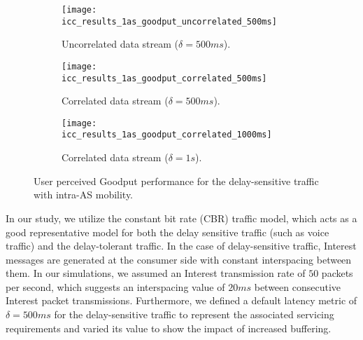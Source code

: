 \documentclass[conference]{IEEEtran}
\begin{document}
\begin{figure*}
        \centering
        \hspace{-0.15in}
        \begin{subfigure}[b]{0.3\textwidth}\centering
               \texttt{[image: icc\_results\_1as\_goodput\_uncorrelated\_500ms]}\\
               \caption{Uncorrelated data stream ($\delta = 500ms$).}
               \label{UncorrelatedGoodput}
        \end{subfigure}
        \hspace{0.05in}
        \begin{subfigure}[b]{0.3\textwidth}\centering
                \texttt{[image: icc\_results\_1as\_goodput\_correlated\_500ms]}\\
                \caption{Correlated data stream ($\delta = 500ms$).}
                \label{CorrelatedGoodput250ms}
        \end{subfigure}
        \hspace{0.05in}
        \begin{subfigure}[b]{0.3\textwidth}\centering
                \texttt{[image: icc\_results\_1as\_goodput\_correlated\_1000ms]}\\
                \caption{Correlated data stream ($\delta = 1s$).}
                \label{CorrelatedGoodput1000ms}
        \end{subfigure}
        \caption{User perceived Goodput performance for the delay-sensitive traffic with intra-AS mobility.}\label{fig:delay_sensitive_goodput}
\end{figure*}

In our study, we utilize the constant bit rate (CBR) traffic model, which acts as a good representative model for both the delay sensitive traffic (such as voice traffic) and the delay-tolerant traffic. In the case of delay-sensitive traffic, Interest messages are generated at the consumer side with constant interspacing between them. In our simulations, we assumed an Interest transmission rate of $50$ packets per second, which suggests an interspacing value of $20ms$ between consecutive Interest packet transmissions. Furthermore, we defined a default latency metric of $\delta=500ms$ for the delay-sensitive traffic to represent the associated servicing requirements and varied its value to show the impact of increased buffering.
\end{document}
